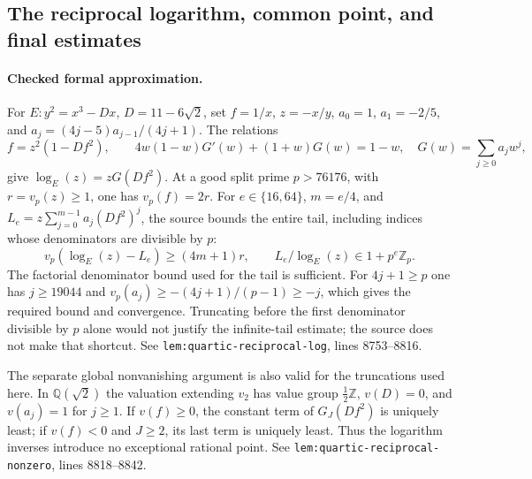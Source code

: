 \documentclass[11pt]{article}
\theoremstyle{definition}
\begin{document}
\subsection{The reciprocal logarithm, common point, and final estimates}

\paragraph{Checked formal approximation.}
For $E:y^2=x^3-Dx$, $D=11-6\sqrt2$, set $f=1/x$, $z=-x/y$,
$a_0=1$, $a_1=-2/5$, and
$a_j=(4j-5)a_{j-1}/(4j+1)$.  The relations
\[
 f=z^2(1-Df^2),\qquad
 4w(1-w)G'(w)+(1+w)G(w)=1-w,
 \quad G(w)=\sum_{j\ge0}a_jw^j,
\]
give $\log_E(z)=zG(Df^2)$.  At a good split prime $p>76176$,
with $r=v_p(z)\ge1$, one has $v_p(f)=2r$.
For $e\in\{16,64\}$, $m=e/4$, and
$L_e=z\sum_{j=0}^{m-1}a_j(Df^2)^j$, the source bounds the entire
tail, including indices whose denominators are divisible by $p$:
\[
 v_p(\log_E(z)-L_e)\ge(4m+1)r,
 \qquad L_e/\log_E(z)\in1+p^e\mathbb Z_p.
\]
The factorial denominator bound used for the tail is sufficient.
For $4j+1\ge p$ one has $j\ge19044$ and
$v_p(a_j)\ge-(4j+1)/(p-1)\ge-j$, which gives the required bound
and convergence.  Truncating before the first denominator divisible by
$p$ alone would not justify the infinite-tail estimate; the source does
not make that shortcut.  See \texttt{lem:quartic-reciprocal-log},
lines 8753--8816.

The separate global nonvanishing argument is also valid for the
truncations used here.  In $\mathbb Q(\sqrt2)$ the valuation extending
$v_2$ has value group $\frac12\mathbb Z$, $v(D)=0$, and $v(a_j)=1$
for $j\ge1$.  If $v(f)\ge0$, the constant term of $G_J(Df^2)$
is uniquely least; if $v(f)<0$ and $J\ge2$, its last term is uniquely
least.  Thus the logarithm inverses introduce no exceptional rational
point.  See \nolinkurl{lem:quartic-reciprocal-nonzero}, lines 8818--8842.
\end{document}

